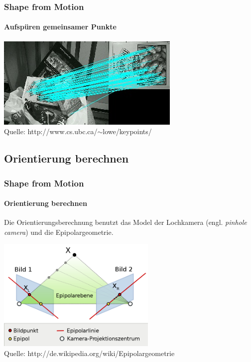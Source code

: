 \documentclass{beamer}
\begin{document}
\begin{frame}
	\frametitle{Shape from Motion}
	\framesubtitle{Aufspüren gemeinsamer Punkte}
	
	\begin{center}
		\includegraphics[width=\linewidth]{includes/sift}\\
		Quelle: http://www.cs.ubc.ca/$\sim$lowe/keypoints/
	\end{center}
\end{frame}


\subsection{Orientierung berechnen}
\begin{frame}
	\frametitle{Shape from Motion}
	\framesubtitle{Orientierung berechnen}
	
	\vspace{1em}
	Die Orientierungsberechnung benutzt das Model der Lochkamera (engl. \textit{pinhole camera}) und die Epipolargeometrie.
	
	\begin{center}
		\includegraphics[width=217pt]{includes/Epipolargeometrie3}\\
		Quelle: http://de.wikipedia.org/wiki/Epipolargeometrie
	\end{center}
\end{frame}
\end{document}

